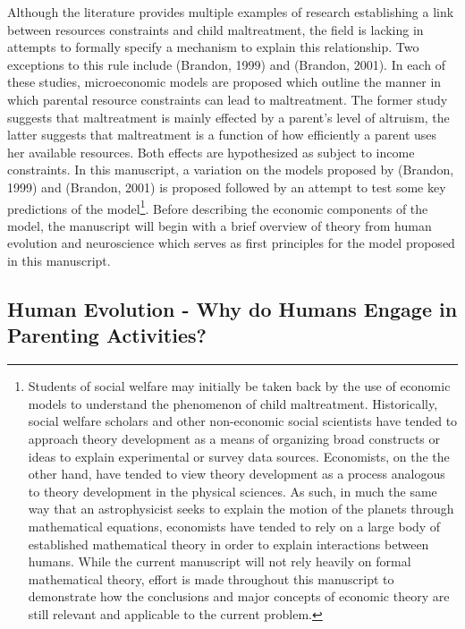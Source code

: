 \documentclass[review]{elsarticle}\usepackage[]{graphicx}\usepackage[]{color}
\begin{document}
Although the literature provides multiple examples of research
establishing a link between resources constraints and child
maltreatment, the field is lacking in attempts to formally specify a
mechanism to explain this relationship. Two exceptions to this rule
include (Brandon, 1999) and (Brandon, 2001). In each of these studies,
microeconomic models are proposed which outline the manner in which
parental resource constraints can lead to maltreatment. The former study
suggests that maltreatment is mainly effected by a parent's level of
altruism, the latter suggests that maltreatment is a function of how
efficiently a parent uses her available resources. Both effects are
hypothesized as subject to income constraints. In this manuscript, a
variation on the models proposed by (Brandon, 1999) and (Brandon, 2001)
is proposed followed by an attempt to test some key predictions of the
model\footnote{Students of social welfare may initially be taken back by
  the use of economic models to understand the phenomenon of child
  maltreatment. Historically, social welfare scholars and other
  non-economic social scientists have tended to approach theory
  development as a means of organizing broad constructs or ideas to
  explain experimental or survey data sources. Economists, on the the
  other hand, have tended to view theory development as a process
  analogous to theory development in the physical sciences. As such, in
  much the same way that an astrophysicist seeks to explain the motion
  of the planets through mathematical equations, economists have tended
  to rely on a large body of established mathematical theory in order to
  explain interactions between humans. While the current manuscript will
  not rely heavily on formal mathematical theory, effort is made
  throughout this manuscript to demonstrate how the conclusions and
  major concepts of economic theory are still relevant and applicable to
  the current problem.}. Before describing the economic components of
the model, the manuscript will begin with a brief overview of theory
from human evolution and neuroscience which serves as first principles
for the model proposed in this manuscript.

\subsection{Human Evolution - Why do Humans Engage in Parenting
Activities?}\label{human-evolution---why-do-humans-engage-in-parenting-activities}
\end{document}
